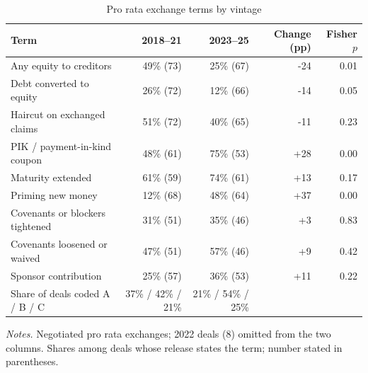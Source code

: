 \begin{table}[htbp]\centering
\caption{Pro rata exchange terms by vintage}
\label{tab:vintage}
\small
\begin{tabular}{l rr r r}
\toprule
Term & 2018--21 & 2023--25 & Change (pp) & Fisher $p$ \\
\midrule
Any equity to creditors & 49\% (73) & 25\% (67) & -24 & 0.01 \\
Debt converted to equity & 26\% (72) & 12\% (66) & -14 & 0.05 \\
Haircut on exchanged claims & 51\% (72) & 40\% (65) & -11 & 0.23 \\
PIK / payment-in-kind coupon & 48\% (61) & 75\% (53) & +28 & 0.00 \\
Maturity extended & 61\% (59) & 74\% (61) & +13 & 0.17 \\
Priming new money & 12\% (68) & 48\% (64) & +37 & 0.00 \\
Covenants or blockers tightened & 31\% (51) & 35\% (46) & +3 & 0.83 \\
Covenants loosened or waived & 47\% (51) & 57\% (46) & +9 & 0.42 \\
Sponsor contribution & 25\% (57) & 36\% (53) & +11 & 0.22 \\
\midrule
Share of deals coded A / B / C & 37\% / 42\% / 21\% & 21\% / 54\% / 25\% & & \\
\bottomrule
\end{tabular}
\begin{minipage}{0.9\textwidth}\vspace{4pt}\footnotesize
\textit{Notes.} Negotiated pro rata exchanges; 2022 deals (8) omitted from the two columns. Shares among deals whose release states the term; number stated in parentheses.
\end{minipage}
\end{table}